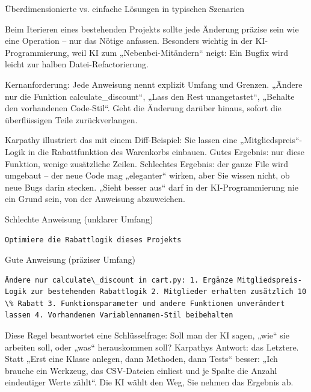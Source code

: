 \begin{center}\small\color{gray}Überdimensionierte vs. einfache Lösungen in typischen Szenarien\end{center}


Beim Iterieren eines bestehenden Projekts sollte jede Änderung präzise sein wie eine Operation – nur das Nötige anfassen. Besonders wichtig in der KI-Programmierung, weil KI zum „Nebenbei-Mitändern“ neigt: Ein Bugfix wird leicht zur halben Datei-Refactorierung.

Kernanforderung: Jede Anweisung nennt explizit Umfang und Grenzen. „Ändere nur die Funktion calculate\_discount“, „Lass den Rest unangetastet“, „Behalte den vorhandenen Code-Stil“. Geht die Änderung darüber hinaus, sofort die überflüssigen Teile zurückverlangen.

Karpathy illustriert das mit einem Diff-Beispiel: Sie lassen eine „Mitgliedspreis“-Logik in die Rabattfunktion des Warenkorbs einbauen. Gutes Ergebnis: nur diese Funktion, wenige zusätzliche Zeilen. Schlechtes Ergebnis: der ganze File wird umgebaut – der neue Code mag „eleganter“ wirken, aber Sie wissen nicht, ob neue Bugs darin stecken. „Sieht besser aus“ darf in der KI-Programmierung nie ein Grund sein, von der Anweisung abzuweichen.

Schlechte Anweisung (unklarer Umfang)

\begin{lstlisting}
Optimiere die Rabattlogik dieses Projekts
\end{lstlisting}

Gute Anweisung (präziser Umfang)

\begin{lstlisting}
Ändere nur calculate\_discount in cart.py: 1. Ergänze Mitgliedspreis-Logik zur bestehenden Rabattlogik 2. Mitglieder erhalten zusätzlich 10 \% Rabatt 3. Funktionsparameter und andere Funktionen unverändert lassen 4. Vorhandenen Variablennamen-Stil beibehalten
\end{lstlisting}


Diese Regel beantwortet eine Schlüsselfrage: Soll man der KI sagen, „wie“ sie arbeiten soll, oder „was“ herauskommen soll? Karpathys Antwort: das Letztere. Statt „Erst eine Klasse anlegen, dann Methoden, dann Tests“ besser: „Ich brauche ein Werkzeug, das CSV-Dateien einliest und je Spalte die Anzahl eindeutiger Werte zählt“. Die KI wählt den Weg, Sie nehmen das Ergebnis ab.

